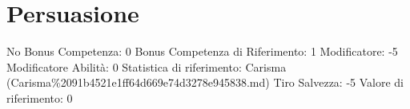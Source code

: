 \section{Persuasione}\label{persuasione}

\begin{description}
\tightlist
\item[Tags: ABI]
No Bonus Competenza: 0 Bonus Competenza di Riferimento: 1 Modificatore:
-5 Modificatore Abilità: 0 Statistica di riferimento: Carisma
(Carisma\%2091b4521e1ff64d669e74d3278e945838.md) Tiro Salvezza: -5
Valore di riferimento: 0
\end{description}
